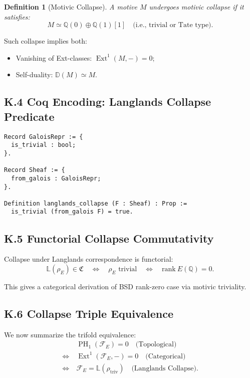 \documentclass[11pt]{article}
\newtheorem{definition}[theorem]{Definition}
\DeclareMathOperator{\Ext}{Ext}
\DeclareMathOperator{\PH}{PH}
\begin{document}
\begin{definition}[Motivic Collapse]
A motive \( M \) undergoes motivic collapse if it satisfies:
\[
M \simeq \mathbb{Q}(0) \oplus \mathbb{Q}(1)[1] \quad \text{(i.e., trivial or Tate type)}.
\]
\end{definition}

Such collapse implies both:
\begin{itemize}
  \item Vanishing of Ext-classes: \( \Ext^1(M, -) = 0 \);
  \item Self-duality: \( \mathbb{D}(M) \simeq M \).
\end{itemize}

\subsection*{K.4 Coq Encoding: Langlands Collapse Predicate}
\begin{lstlisting}[language=Coq]
Record GaloisRepr := {
  is_trivial : bool;
}.

Record Sheaf := {
  from_galois : GaloisRepr;
}.

Definition langlands_collapse (F : Sheaf) : Prop :=
  is_trivial (from_galois F) = true.
\end{lstlisting}

\subsection*{K.5 Functorial Collapse Commutativity}

Collapse under Langlands correspondence is functorial:
\[
\mathbb{L}(\rho_E) \in \mathfrak{C} \quad \Leftrightarrow \quad \rho_E \text{ trivial} \quad \Leftrightarrow \quad \mathrm{rank}~E(\mathbb{Q}) = 0.
\]

This gives a categorical derivation of BSD rank-zero case via motivic triviality.

\subsection*{K.6 Collapse Triple Equivalence}

We now summarize the trifold equivalence:
\[
\begin{aligned}
& \PH_1(\mathcal{F}_E) = 0 \quad \text{(Topological)} \\
\iff\ & \Ext^1(\mathcal{F}_E, -) = 0 \quad \text{(Categorical)} \\
\iff\ & \mathcal{F}_E = \mathbb{L}(\rho_{\mathrm{triv}}) \quad \text{(Langlands Collapse)}.
\end{aligned}
\]
\end{document}
